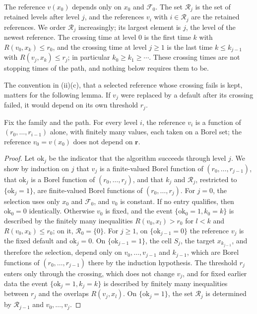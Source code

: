 The reference $v(x_0)$ depends only on $x_0$ and $\mathcal F_0$. The set $\mathcal R_j$ is the set of retained levels after level $j$, and the references $v_i$ with $i\in\mathcal R_j$ are the retained references. We order $\mathcal R_j$ increasingly; its largest element is $j$, the level of the newest reference. The crossing time at level $0$ is the first time $k$ with $R(v_0,x_k)\le r_0$, and the crossing time at level $j\ge1$ is the last time $k\le k_{j-1}$ with $R(v_j,x_k)\le r_j$; in particular $k_0\ge k_1\ge\cdots$. These crossing times are not stopping times of the path, and nothing below requires them to be.

The convention in (ii)(c), that a selected reference whose crossing fails is kept, matters for the following lemma. If $v_j$ were replaced by a default after its crossing failed, it would depend on its own threshold $r_j$.

\begin{lemma}\label{lem:ind-predictable}
Fix the family and the path. For every level $i$, the reference $v_i$ is a function of $(r_0,\dots,r_{i-1})$ alone, with finitely many values, each taken on a Borel set; the reference $v_0=v(x_0)$ does not depend on $\mathbf r$.
\end{lemma}

\begin{proof}
Let $\mathrm{ok}_j$ be the indicator that the algorithm succeeds through level $j$. We show by induction on $j$ that $v_j$ is a finite-valued Borel function of $(r_0,\dots,r_{j-1})$, that $\mathrm{ok}_j$ is a Borel function of $(r_0,\dots,r_j)$, and that $k_j$ and $\mathcal R_j$, restricted to $\{\mathrm{ok}_j=1\}$, are finite-valued Borel functions of $(r_0,\dots,r_j)$. For $j=0$, the selection uses only $x_0$ and $\mathcal F_0$, and $v_0$ is constant. If no entry qualifies, then $\mathrm{ok}_0=0$ identically. Otherwise $v_0$ is fixed, and the event $\{\mathrm{ok}_0=1,k_0=k\}$ is described by the finitely many inequalities $R(v_0,x_l)>r_0$ for $l<k$ and $R(v_0,x_k)\le r_0$; on it, $\mathcal R_0=\{0\}$. For $j\ge1$, on $\{\mathrm{ok}_{j-1}=0\}$ the reference $v_j$ is the fixed default and $\mathrm{ok}_j=0$. On $\{\mathrm{ok}_{j-1}=1\}$, the cell $S_j$, the target $x_{k_{j-1}}$, and therefore the selection, depend only on $v_0,\dots,v_{j-1}$ and $k_{j-1}$, which are Borel functions of $(r_0,\dots,r_{j-1})$ there by the induction hypothesis. The threshold $r_j$ enters only through the crossing, which does not change $v_j$, and for fixed earlier data the event $\{\mathrm{ok}_j=1,k_j=k\}$ is described by finitely many inequalities between $r_j$ and the overlaps $R(v_j,x_l)$. On $\{\mathrm{ok}_j=1\}$, the set $\mathcal R_j$ is determined by $\mathcal R_{j-1}$ and $v_0,\dots,v_j$.
\end{proof}

